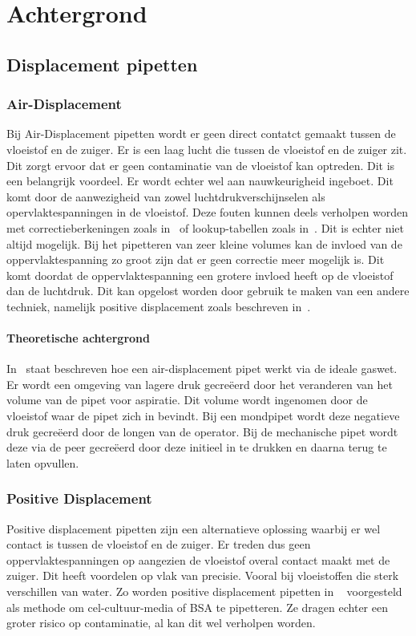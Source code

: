 \chapter{Achtergrond}


\section{Displacement pipetten}
\subsection{Air-Displacement}
Bij Air-Displacement pipetten wordt er geen direct contatct gemaakt tussen de vloeistof en de zuiger. Er is een laag lucht die tussen de vloeistof en de zuiger zit. Dit zorgt ervoor dat er geen contaminatie van de vloeistof kan optreden. Dit is een belangrijk voordeel. Er wordt echter wel aan nauwkeurigheid ingeboet. Dit komt door de aanwezigheid van zowel luchtdrukverschijnselen als opervlaktespanningen in de vloeistof. Deze fouten kunnen deels verholpen worden met correctieberkeningen zoals in\ \cite{RN15} of lookup-tabellen zoals in\ \cite{RN35}. Dit is echter niet altijd mogelijk. Bij het pipetteren van zeer kleine volumes kan de invloed van de oppervlaktespanning zo groot zijn dat er geen correctie meer mogelijk is. Dit komt doordat de oppervlaktespanning een grotere invloed heeft op de vloeistof dan de luchtdruk. Dit kan opgelost worden door gebruik te maken van een andere techniek, namelijk positive displacement zoals beschreven in\ \cite{RN15}.
\subsubsection{Theoretische achtergrond}
In\ \cite{RN15} staat beschreven hoe een air-displacement pipet werkt via de ideale gaswet. Er wordt een omgeving van lagere druk gecreëerd door het veranderen van het volume van de pipet voor aspiratie. Dit volume wordt ingenomen door de vloeistof waar de pipet zich in bevindt. Bij een mondpipet wordt deze negatieve druk gecreëerd door de longen van de operator. Bij de mechanische pipet wordt deze via de peer gecreëerd door deze initieel in te drukken en daarna terug te laten opvullen.
\subsection{Positive Displacement}
Positive displacement pipetten zijn een alternatieve oplossing waarbij er wel contact is tussen de vloeistof en de zuiger. Er treden dus geen oppervlaktespanningen op aangezien de vloeistof overal contact maakt met de zuiger. Dit heeft voordelen op vlak van precisie. Vooral bij vloeistoffen die sterk verschillen van water. Zo worden positive displacement pipetten in \ \cite{RN37} voorgesteld als methode om cel-cultuur-media of BSA te pipetteren. Ze dragen echter een groter risico op contaminatie, al kan dit wel verholpen worden.

